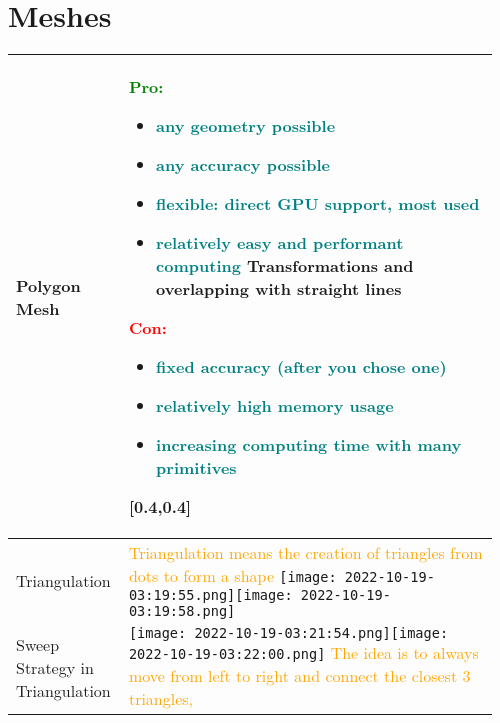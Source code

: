 \documentclass[main.tex,fontsize=8pt,paper=a4,paper=portrait,DIV=calc,]{scrartcl}
\begin{document}
\begin{table}[ht!]
\section{Meshes}
\begin{tabular}{|m{0.2\linewidth}|m{0.755\linewidth}|}
\hline
Polygon Mesh & \minipg{
\textcolor{green}{Pro:}\newline
\begin{itemize}
  \item \textcolor{teal}{any geometry possible}
  \item \textcolor{teal}{any accuracy possible}
  \item \textcolor{teal}{flexible: direct GPU support, most used}
  \item \textcolor{teal}{relatively easy and performant computing}\newline
    Transformations and overlapping with straight lines
\end{itemize}
}
{
\textcolor{red}{Con:}\newline
\begin{itemize}
  \item \textcolor{teal}{fixed accuracy (after you chose one)}
  \item \textcolor{teal}{relatively high memory usage}
  \item \textcolor{teal}{increasing computing time with many primitives}\newline 
  \, \newline
  \, \newline
  \, \newline
  \vspace{-3mm}
\end{itemize}
}[0.4,0.4]\\
\hline
Triangulation & 
\textcolor{orange}{Triangulation means the creation of triangles from dots to form a shape}\newline
\texttt{[image: 2022-10-19-03:19:55.png]}\texttt{[image: 2022-10-19-03:19:58.png]}\\
\hline
Sweep Strategy \newline in Triangulation & 
\vspace{2mm}
\texttt{[image: 2022-10-19-03:21:54.png]}\texttt{[image: 2022-10-19-03:22:00.png]}\newline
\textcolor{orange}{The idea is to always move from left to right and connect the closest 3 triangles,\newline
}
\end{tabular}
\end{table}
\end{document}
